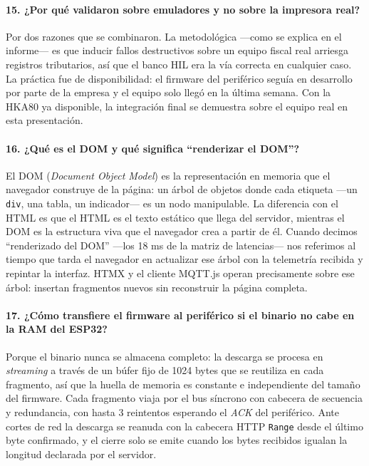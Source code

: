 \documentclass[11pt, a4paper]{article}
\begin{document}
\paragraph{15. ¿Por qué validaron sobre emuladores y no sobre la impresora real?}
Por dos razones que se combinaron. La metodológica —como se explica en el informe— es que inducir fallos destructivos sobre un equipo fiscal real arriesga registros tributarios, así que el banco HIL era la vía correcta en cualquier caso. La práctica fue de disponibilidad: el firmware del periférico seguía en desarrollo por parte de la empresa y el equipo solo llegó en la última semana. Con la HKA80 ya disponible, la integración final se demuestra sobre el equipo real en esta presentación.

\paragraph{16. ¿Qué es el DOM y qué significa ``renderizar el DOM''?}
El DOM (\textit{Document Object Model}) es la representación en memoria que el navegador construye de la página: un árbol de objetos donde cada etiqueta —un \texttt{div}, una tabla, un indicador— es un nodo manipulable. La diferencia con el HTML es que el HTML es el texto estático que llega del servidor, mientras el DOM es la estructura viva que el navegador crea a partir de él. Cuando decimos ``renderizado del DOM'' —los 18 ms de la matriz de latencias— nos referimos al tiempo que tarda el navegador en actualizar ese árbol con la telemetría recibida y repintar la interfaz. HTMX y el cliente MQTT.js operan precisamente sobre ese árbol: insertan fragmentos nuevos sin reconstruir la página completa.

\paragraph{17. ¿Cómo transfiere el firmware al periférico si el binario no cabe en la RAM del ESP32?}
Porque el binario nunca se almacena completo: la descarga se procesa en \textit{streaming} a través de un búfer fijo de 1024 bytes que se reutiliza en cada fragmento, así que la huella de memoria es constante e independiente del tamaño del firmware. Cada fragmento viaja por el bus síncrono con cabecera de secuencia y redundancia, con hasta 3 reintentos esperando el \textit{ACK} del periférico. Ante cortes de red la descarga se reanuda con la cabecera HTTP \texttt{Range} desde el último byte confirmado, y el cierre solo se emite cuando los bytes recibidos igualan la longitud declarada por el servidor.
\end{document}
